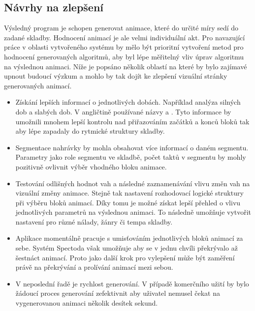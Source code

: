 \subsection{Návrhy na zlepšení} \label{sec:Hodnoceni_systemu}

Výsledný program je schopen generovat animace, které do určité míry sedí do zadané skladby. Hodnocení animací je ale velmi individuální akt. Pro navazující práce v oblasti vytvořeného systému by mělo být prioritní vytvoření metod pro hodnocení generovaných algoritmů, aby byl lépe měřitelný vliv úprav algoritmu na výslednou animaci. Níže je popsáno několik oblastí na které by bylo zajímavé upnout budoucí výzkum a mohlo by tak dojít ke zlepšení vizuální stránky generovaných animací. 
\begin{itemize}
    \item Získání lepších informací o jednotlivých dobách. Například analýza silných dob a slabých dob. V angličtině používané názvy  a . Tyto informace by umožnili mnohem lepší kontrolu nad přiřazováním začátků a konců bloků tak aby lépe zapadaly do rytmické struktury skladby.
    \item Segmentace nahrávky by mohla obsahovat více informací o daném segmentu. Parametry jako role segmentu ve skladbě, počet taktů v segmentu by mohly pozitivně ovlivnit výběr vhodného bloku animace.
    \item Testování odlišných hodnot vah a následné zaznamenávání vlivu změn vah na vizuální změny animace. Stejně tak nastavení rozhodovací logické struktury při výběru bloků animací. Díky tomu je možné získat lepší přehled o vlivu jednotlivých parametrů na výslednou animaci. To následně umožňuje vytvořit nastavení pro různé nálady, žánry či tempa skladby. 
    \item Aplikace momentálně pracuje s umisťováním jednotlivých bloků animací za sebe. Systém Spectoda však umožňuje aby se v jednu chvíli překrývalo až šestnáct animací. Proto jako další krok pro vylepšení může být zaměření právě na překrývání a prolívání animací mezi sebou. 
    \item V neposlední řadě je rychlost generování. V případě komerčního užití by bylo žádoucí proces generování zefektivnit aby uživatel nemusel čekat na vygenerovanou animaci několik desítek sekund. 
\end{itemize}

